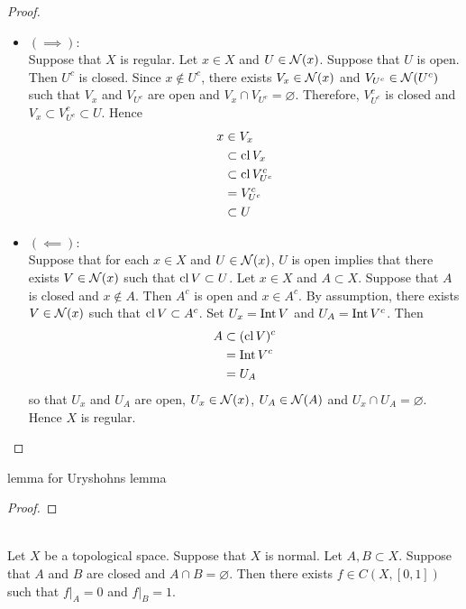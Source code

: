 \documentclass{book}
\begin{document}
	\begin{proof}\
		\begin{itemize}
			\item $(\implies)$: \\
			Suppose that $X$ is regular. Let $x \in X$ and $U \in \mathcal{N}(x)$. Suppose that $U$ is open. Then $U^c$ is closed. Since $x \not \in U^c$, there exists $V_x \in \mathcal{N}(x)$ and $V_{U^c} \in \mathcal{N}(U^c)$ such that $V_x$ and $V_{U^c}$ are open and $V_x \cap V_{U^c} = \varnothing$. Therefore, $V_{U^c}^c$ is closed and $V_x \subset V_{U^c}^c \subset U$. Hence
			\begin{align*}
				x 
				& \in V_x \\
				& \subset \operatorname{cl} V_x \\
				& \subset \operatorname{cl} V_{U^c}^c \\
				& = V_{U^c}^c \\
				& \subset U
			\end{align*} 
			\item $(\impliedby)$: \\
			Suppose that for each $x \in X$ and $U \in \mathcal{N}(x)$, $U$ is open implies that there exists $V \in \mathcal{N}(x)$ such that $\operatorname{cl} V \subset U$. Let $x \in X$ and $A \subset X$. Suppose that $A$ is closed and $x \not \in A$. Then $A^c$ is open and $x \in A^c$. By assumption, there exists $V \in \mathcal{N}(x)$ such that $\operatorname{cl} V \subset A^c$. Set $U_x = \operatorname{Int} V$ and $U_A = \operatorname{Int} V^c$. Then 
			\begin{align*}
				A 
				& \subset (\operatorname{cl} V)^c \\
				& = \operatorname{Int} V^c \\
				& = U_A
			\end{align*} 
			so that $U_x$ and $U_A$ are open, $U_x \in \mathcal{N}(x)$, $U_A \in \mathcal{N}(A)$ and $U_x \cap U_A = \varnothing$. Hence $X$ is regular.
		\end{itemize}
	\end{proof}

	\begin{ex}
		lemma for Uryshohns lemma
	\end{ex}

	\begin{proof}
	\end{proof}


	\begin{ex}  \\
		Let $X$ be a topological space. Suppose that $X$ is normal. Let $A,B \subset X$. Suppose that $A$ and $B$ are closed and $A \cap B = \varnothing$. Then there exists $f \in C(X, [0,1])$ such that $f|_A = 0$ and $f|_B = 1$. 
	\end{ex}
\end{document}
